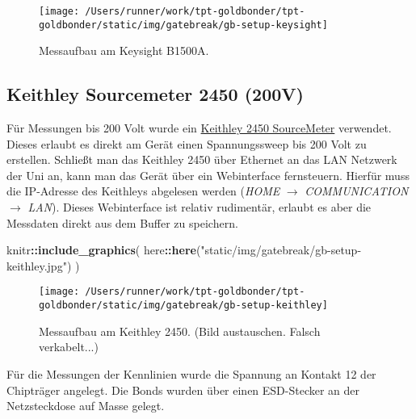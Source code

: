 \documentclass[
  paper=a4,
  ,captions=tableheading
]{scrartcl}
\newenvironment{Shaded}{\begin{snugshade}}{\end{snugshade}}
\newcommand{\KeywordTok}[1]{\textcolor[rgb]{0.13,0.29,0.53}{\textbf{#1}}}
\newcommand{\NormalTok}[1]{#1}
\newcommand{\OperatorTok}[1]{\textcolor[rgb]{0.81,0.36,0.00}{\textbf{#1}}}
\newcommand{\StringTok}[1]{\textcolor[rgb]{0.31,0.60,0.02}{#1}}
\begin{document}
\begin{figure}

{\centering \texttt{[image: /Users/runner/work/tpt-goldbonder/tpt-goldbonder/static/img/gatebreak/gb-setup-keysight]} 

}

\caption{Messaufbau am Keysight B1500A.}\label{fig:keysight-setup}
\end{figure}

\hypertarget{keithley}{%
\subsection{Keithley Sourcemeter 2450 (200V)}\label{keithley}}

Für Messungen bis 200 Volt wurde ein \href{https://www.datatec.de/keithley-2450}{Keithley 2450 SourceMeter} verwendet. Dieses erlaubt es direkt am Gerät einen Spannungssweep bis 200 Volt zu erstellen. Schließt man das Keithley 2450 über Ethernet an das LAN Netzwerk der Uni an, kann man das Gerät über ein Webinterface fernsteuern. Hierfür muss die IP-Adresse des Keithleys abgelesen werden (\emph{HOME} \(\rightarrow\) \emph{COMMUNICATION} \(\rightarrow\) \emph{LAN}). Dieses Webinterface ist relativ rudimentär, erlaubt es aber die Messdaten direkt aus dem Buffer zu speichern.

\begin{Shaded}
\begin{Highlighting}[]
\NormalTok{knitr}\OperatorTok{::}\KeywordTok{include_graphics}\NormalTok{(}
\NormalTok{  here}\OperatorTok{::}\KeywordTok{here}\NormalTok{(}\StringTok{"static/img/gatebreak/gb-setup-keithley.jpg"}\NormalTok{)}
\NormalTok{)}
\end{Highlighting}
\end{Shaded}

\begin{figure}

{\centering \texttt{[image: /Users/runner/work/tpt-goldbonder/tpt-goldbonder/static/img/gatebreak/gb-setup-keithley]} 

}

\caption{Messaufbau am Keithley 2450. (Bild austauschen. Falsch verkabelt...)}\label{fig:keythley-setup}
\end{figure}

Für die Messungen der Kennlinien wurde die Spannung an Kontakt 12 der Chipträger angelegt. Die Bonds wurden über einen ESD-Stecker an der Netzsteckdose auf Masse gelegt.
\end{document}

